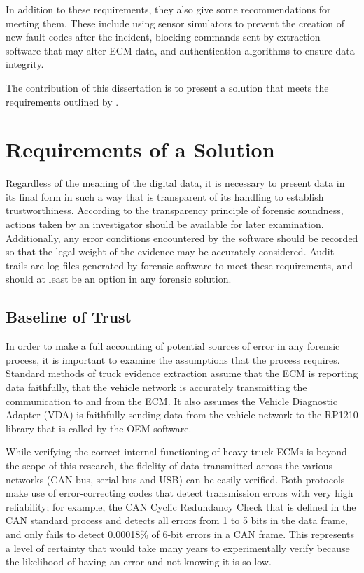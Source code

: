 In addition to these requirements, they also give some recommendations for meeting them. These include using sensor simulators to prevent the creation of new fault codes
after the incident, blocking commands sent by extraction software that may alter ECM data, and authentication algorithms to ensure data integrity.

The contribution of this dissertation is to present a solution that meets the requirements outlined by \cite{Johnson2014}.

\chapter{Requirements of a Solution}

Regardless of the meaning of the digital data, it is necessary to present data in its final form in such a way that is transparent of its handling to establish trustworthiness. 
According to the transparency principle of forensic soundness, actions taken by an investigator should be available for later examination. Additionally, any error conditions 
encountered by the software should be recorded so that the legal weight of the evidence may be accurately considered. Audit trails are log files generated by forensic software 
to meet these requirements, and should at least be an option in any forensic solution.

\section{Baseline of Trust}

In order to make a full accounting of potential sources of error in any forensic process, it is important to examine the assumptions that the process requires. Standard methods of 
truck evidence extraction assume that the ECM is reporting data faithfully, that the vehicle network is accurately transmitting the communication to and from the ECM. It also assumes 
the Vehicle Diagnostic Adapter (VDA) is faithfully sending data from the vehicle network to the RP1210 library that is called by the OEM software.

While verifying the correct internal functioning of heavy truck ECMs is beyond the scope of this research, the fidelity of data transmitted across the various networks (CAN bus, serial 
bus and USB) can be easily verified. Both protocols make use of error-correcting codes that detect transmission errors with very high reliability; for example, the CAN 
Cyclic Redundancy Check that is defined in the CAN standard process and detects all errors from 1 to 5 bits in the data frame, and only fails to detect 0.00018\% of 6-bit 
errors in a CAN frame\cite{koopman2004}. This represents a level of certainty that would take many years to experimentally verify because the likelihood of having an error and not knowing 
it is so low.

